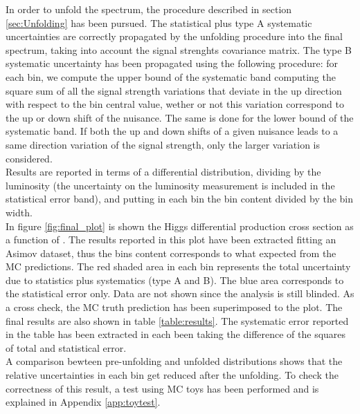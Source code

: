 In order to unfold the spectrum, the procedure described in section \ref{sec:Unfolding} has been pursued.
The statistical plus type A systematic uncertainties are correctly propagated by the unfolding procedure into the final spectrum, taking into account the signal strenghts covariance matrix. The type B systematic uncertainty has been propagated using the following procedure: for each \pth bin, we compute the upper bound of the systematic band computing the square sum of all the signal strength variations that deviate in the up direction with respect to the bin central value, wether or not this variation correspond to the up or down shift of the nuisance. The same is done for the lower bound of the systematic band. If both the up and down shifts of a given nuisance leads to a same direction variation of the signal strength, only the larger variation is considered.\\
Results are reported in terms of a differential distribution, dividing by the luminosity (the uncertainty on the luminosity measurement is included in the statistical error band), and putting in each bin the bin content divided by the bin width.\\
In figure \ref{fig:final_plot} is shown the Higgs differential production cross section as a function of \pth. The results reported in this plot have been extracted fitting an Asimov dataset, thus the bins content corresponds to what expected from the MC predictions. The red shaded area in each bin represents the total uncertainty due to statistics plus systematics (type A and B). The blue area corresponds to the statistical error only. Data are not shown since the analysis is still blinded. As a cross check, the MC truth prediction has been superimposed to the plot. The final results are also shown in table \ref{table:results}. The systematic error reported in the table has been extracted in each been taking the difference of the squares of total and statistical error.\\
A comparison bewteen pre-unfolding and unfolded distributions shows that the relative uncertainties in each bin get reduced after the unfolding. To check the correctness of this result, a test using MC toys has been performed and is explained in Appendix \ref{app:toytest}.

